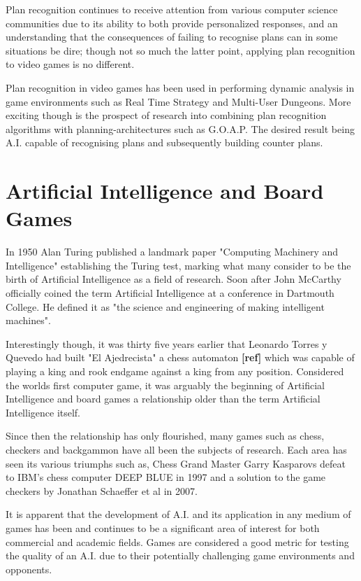 \documentclass[parskip]{cs4rep}
\begin{document}
Plan recognition continues to receive attention from various computer science communities due to its ability to both provide personalized responses, and an understanding that the consequences of failing to recognise plans can in some situations be dire; though not so much the latter point, applying plan recognition to video games is no different.

Plan recognition in video games has been used in performing dynamic analysis in game environments such as Real Time Strategy \cite{conf/aiide/SynnaeveB11} and Multi-User Dungeons\cite{Albrecht:1998:BMK:598277.598308}. More exciting though is the prospect of research into combining plan recognition algorithms with planning-architectures such as G.O.A.P. The desired result being A.I. capable of recognising plans and subsequently building counter plans.

\section{Artificial Intelligence and Board Games}

In 1950 Alan Turing published a landmark paper "Computing Machinery and Intelligence" establishing the Turing test, marking what many consider to be the birth of Artificial Intelligence as a field of research. Soon after John McCarthy officially coined the term Artificial Intelligence at a conference in Dartmouth College. He defined it as "the science and engineering of making intelligent machines".

Interestingly though, it was thirty five years earlier that Leonardo Torres y Quevedo had built "El Ajedrecista" a chess automaton \textbf{[ref]} which was capable of playing a king and rook endgame against a king from any position. Considered the worlds first computer game, it was arguably the beginning of Artificial Intelligence and board games a relationship older than the term Artificial Intelligence itself. 

Since then the relationship has only flourished, many games such as chess, checkers and backgammon have all been the subjects of research. Each area has seen its various triumphs such as, Chess Grand Master Garry Kasparovs defeat to IBM's chess computer DEEP BLUE in 1997 and a solution to the game checkers by Jonathan Schaeffer et al in 2007.

It is apparent that the development of A.I. and its application in any medium of games has been and continues to be a significant area of interest for both commercial and academic fields. Games are considered a good metric for testing the quality of an A.I. due to their potentially challenging game environments and opponents.
\end{document}
